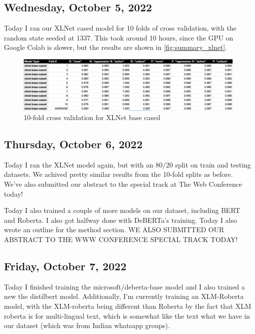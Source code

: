 \documentclass[11pt,letterpaper]{article}
\begin{document}
\subsection{Wednesday, October 5, 2022}
Today I ran our XLNet cased model for 10 folds of cross validation, with the random state seeded at 1337. This took around 10 hours, since the GPU on Google Colab is slower, but the results are shown in \ref{fig:summary_xlnet}.

\begin{figure}
    \centering
    \includegraphics[scale=0.4]{images/summary_xlnet.png}
    \caption{10-fold cross validation for XLNet base cased}
    \label{fig:fig:summary_xlnet}
\end{figure}

\subsection{Thursday, October 6, 2022}

Today I ran the XLNet model again, but with an 80/20 split on train and testing datasets. We achived pretty similar results from the 10-fold splits as before. We've also submitted our abstract to the special track at The Web Conference today!


Today I also trained a couple of more models on our dataset, including BERT and Roberta. I also got halfway done with DeBERTa's training. Today I also wrote an outline for the method section. WE ALSO SUBMITTED OUR ABSTRACT TO THE WWW CONFERENCE SPECIAL TRACK TODAY!



\subsection{Friday, October 7, 2022}
Today I finished training the microsoft/deberta-base model and I also trained a new the distilbert model. Additionally, I'm currently training an XLM-Roberta model, with the XLM-roberta being different than Roberta by the fact that XLM roberta is for multi-lingual text, which is somewhat like the text what we have in our dataset (which was from Indian whatsapp groups).
\end{document}
